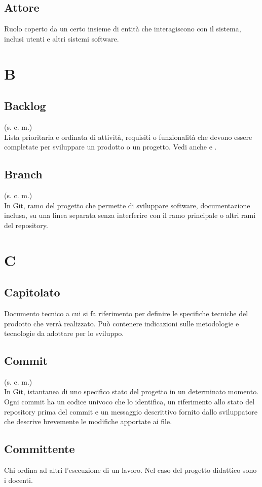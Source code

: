     \subsection{Attore}
    Ruolo coperto da un certo insieme di entità che interagiscono con il sistema, 
    inclusi utenti e altri sistemi software.
\pagebreak
\section{B}
    \subsection{Backlog}
    (s. c. m.)\\
    Lista prioritaria e ordinata di attività, requisiti o funzionalità che devono 
    essere completate per sviluppare un prodotto o un progetto.
    Vedi anche  e .
    \subsection{Branch} 
    (s. c. m.)\\
    In Git, ramo del progetto che permette di sviluppare software, documentazione inclusa, su una linea separata 
    senza interferire con il ramo principale o altri rami del repository.
\pagebreak
\section{C}
    \subsection{Capitolato}
    Documento tecnico a cui si fa riferimento per definire le specifiche tecniche 
    del prodotto che verrà realizzato. Può contenere indicazioni sulle metodologie e
    tecnologie da adottare per lo sviluppo.
    \subsection{Commit}
    (s. c. m.)\\
    In Git, istantanea di uno specifico stato del progetto in un determinato momento.
    Ogni commit ha un codice univoco che lo identifica,
    un riferimento allo stato del repository prima del commit e un messaggio descrittivo 
    fornito dallo sviluppatore che descrive brevemente le modifiche apportate ai file.
    \subsection{Committente}
    Chi ordina ad altri l'esecuzione di un lavoro. Nel caso del progetto didattico
    sono i docenti.
